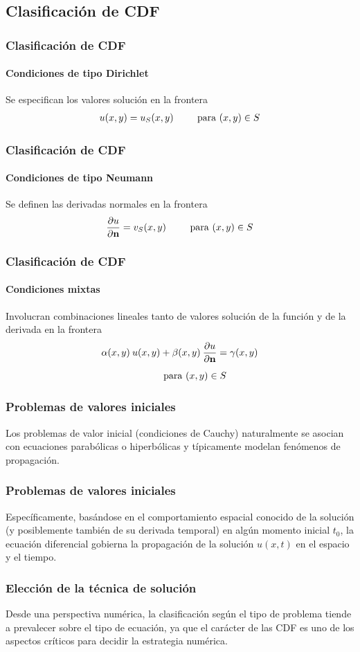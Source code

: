 \subsection{Clasificación de CDF}
\begin{frame}
\frametitle{Clasificación de CDF}
\framesubtitle{Condiciones de tipo Dirichlet}
Se especifican los valores solución en la frontera
\begin{align*}
u(x, y) = u_{S}(x, y) \hspace{0.75cm} \mbox{ para } (x, y) \in S
\end{align*}
\end{frame}
\begin{frame}
\frametitle{Clasificación de CDF}
\framesubtitle{Condiciones de tipo Neumann}
Se definen las derivadas normales en la frontera
\begin{align*}
\pdv{u}{\mathbf{n}} (x, y) = v_{S}(x, y) \hspace{0.75cm} \mbox{ para } (x, y) \in S
\end{align*}
\end{frame}
\begin{frame}
\frametitle{Clasificación de CDF}
\framesubtitle{Condiciones mixtas}
Involucran combinaciones lineales tanto de valores solución de la función y de la derivada en la frontera
\begin{align*}
\alpha(x, y) \: u(x, y) &+ \beta(x, y) \: \pdv{u}{\mathbf{n}} = \gamma(x, y) \\[0.5em]
&\mbox{ para } (x, y) \in S
\end{align*}
\end{frame}
\begin{frame}
\frametitle{Problemas de valores iniciales}
Los problemas de valor inicial (condiciones de Cauchy) naturalmente se asocian con ecuaciones parabólicas o hiperbólicas y típicamente modelan fenómenos de propagación.
\end{frame}
\begin{frame}
\frametitle{Problemas de valores iniciales}
Específicamente, basándose en el comportamiento espacial conocido de la solución (y posiblemente también de su derivada temporal) en algún momento inicial $t_{0}$, la ecuación diferencial gobierna la propagación de la solución $u(x, t)$ en el espacio y el tiempo.
\end{frame}
\begin{frame}
\frametitle{Elección de la técnica de solución}
Desde una perspectiva numérica, la clasificación según el tipo de problema tiende a prevalecer sobre el tipo de ecuación, ya que el carácter de las CDF es uno de los aspectos críticos para decidir la estrategia numérica.
\end{frame}
